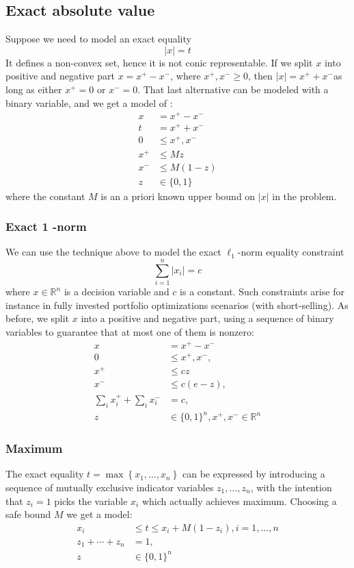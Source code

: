 {\subsection{Exact absolute value}
Suppose we need to model an exact equality
$$
|x|=t
$$
It defines a non-convex set, hence it is not conic representable. If we split $x$ into positive and negative part $x=x^{+}-x^{-}$, where $x^{+}, x^{-} \geq 0$, then $|x|=x^{+}+x^{-}$as long as either $x^{+}=0$ or $x^{-}=0$. That last alternative can be modeled with a binary variable, and we get a model of  :
$$
\begin{aligned}
x &=x^{+}-x^{-} \\
t &=x^{+}+x^{-} \\
0 & \leq x^{+}, x^{-} \\
x^{+} & \leq M z \\
x^{-} & \leq M(1-z) \\
z & \in\{0,1\}
\end{aligned}
$$
where the constant $M$ is an a priori known upper bound on $|x|$ in the problem.

\subsubsection{Exact 1 -norm}
We can use the technique above to model the exact $\ell_{1}$-norm equality constraint
$$
\sum_{i=1}^{n}\left|x_{i}\right|=c
$$
where $x \in \mathbb{R}^{n}$ is a decision variable and $c$ is a constant. Such constraints arise for instance in fully invested portfolio optimizations scenarios (with short-selling). As before, we split $x$ into a positive and negative part, using a sequence of binary variables to guarantee that at most one of them is nonzero:
$$
\begin{aligned}
x &=x^{+}-x^{-} \\
0 & \leq x^{+}, x^{-}, \\
x^{+} & \leq c z \\
x^{-} & \leq c(e-z), \\
\sum_{i} x_{i}^{+}+\sum_{i} x_{i}^{-} &=c, \\
z & \in\{0,1\}^{n}, x^{+}, x^{-} \in \mathbb{R}^{n}
\end{aligned}
$$

\subsubsection{Maximum}
The exact equality $t=\max \left\{x_{1}, \ldots, x_{n}\right\}$ can be expressed by introducing a sequence of mutually exclusive indicator variables $z_{1}, \ldots, z_{n}$, with the intention that $z_{i}=1$ picks the variable $x_{i}$ which actually achieves maximum. Choosing a safe bound $M$ we get a model:
$$
\begin{aligned}
x_{i} & \leq t \leq x_{i}+M\left(1-z_{i}\right), i=1, \ldots, n \\
z_{1}+\cdots+z_{n} &=1, \\
z & \in\{0,1\}^{n}
\end{aligned}
$$

}
